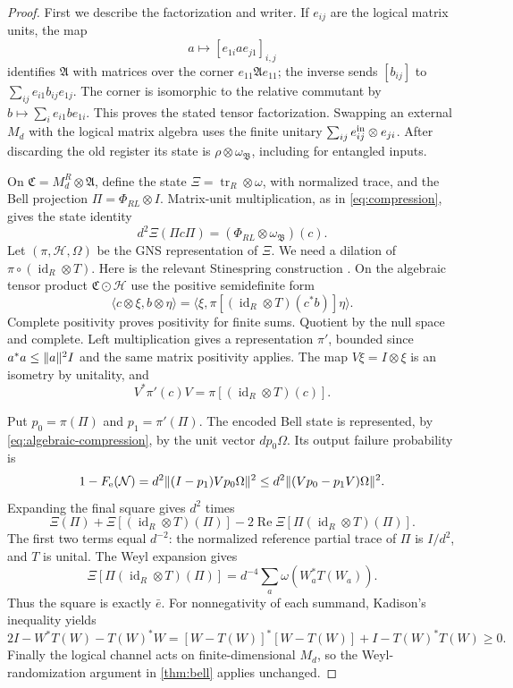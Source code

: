 \documentclass[11pt,reqno]{amsart}
\numberwithin{equation}{section}
\theoremstyle{definition}
\theoremstyle{remark}
\newcommand{\id}{\operatorname{id}}
\newcommand{\Rea}{\operatorname{Re}}
\newcommand{\Ncal}{\mathcal N}
\newcommand{\Fe}{F_{\mathrm e}}
\DeclarePairedDelimiter{\norm}{\lVert}{\rVert}
\begin{document}
\begin{proof}
First we describe the factorization and writer. If \(e_{ij}\) are the
logical matrix units, the map
\[
        a\longmapsto [e_{1i}ae_{j1}]_{i,j}
\]
identifies \(\mathfrak A\) with matrices over the corner
\(e_{11}\mathfrak A e_{11}\); the inverse sends \([b_{ij}]\) to
\(\sum_{ij}e_{i1}b_{ij}e_{1j}\).
The corner is isomorphic to the relative commutant by
\(b\mapsto\sum_i e_{i1}be_{1i}\).
This proves the stated tensor factorization.
Swapping an external \(M_d\) with the logical matrix algebra uses the
finite unitary \(\sum_{ij}e_{ij}^{\rm in}\otimes e_{ji}\).
After discarding the old register its state is
\(\rho\otimes\omega_{\mathfrak B}\), including for entangled inputs.

On \(\mathfrak C=M_d^R\otimes\mathfrak A\), define the state
\(\Xi=\operatorname{tr}_R\otimes\omega\), with normalized trace,
and the Bell projection \(\Pi=\Phi_{RL}\otimes I\).
Matrix-unit multiplication, as in \eqref{eq:compression}, gives the
state identity
\begin{equation}\label{eq:algebraic-compression}
       d^2\Xi(\Pi c\Pi)=(\Phi_{RL}\otimes\omega_{\mathfrak B})(c).
\end{equation}
Let \((\pi,\mathcal H,\Omega)\) be the GNS representation of \(\Xi\).
We need a dilation of \(\pi\circ(\id_R\otimes T)\).
Here is the relevant Stinespring construction \cite{Stinespring55}.
On the algebraic tensor product \(\mathfrak C\odot\mathcal H\) use the
positive semidefinite form
\[
 \langle c\otimes\xi,b\otimes\eta\rangle
  =\langle\xi,\pi[(\id_R\otimes T)(c^*b)]\eta\rangle.
\]
Complete positivity proves positivity for finite sums.
Quotient by the null space and complete. Left multiplication gives
a representation \(\pi'\), bounded since \(a^*a\le\norm a^2 I\)
and the same matrix positivity applies. The map \(V\xi=I\otimes\xi\)
is an isometry by unitality, and
\[
        V^*\pi'(c)V=\pi[(\id_R\otimes T)(c)].
\]

Put \(p_0=\pi(\Pi)\) and \(p_1=\pi'(\Pi)\).
The encoded Bell state is represented, by
\eqref{eq:algebraic-compression}, by the unit vector \(d p_0\Omega\).
Its output failure probability is
\[
 1-\Fe(\Ncal)
    =d^2\norm{(I-p_1)Vp_0\Omega}^2
    \le d^2\norm{(Vp_0-p_1V)\Omega}^2 .
\]
Expanding the final square gives \(d^2\) times
\[
 \Xi(\Pi)+\Xi[(\id_R\otimes T)(\Pi)]
       -2\Rea\Xi[\Pi(\id_R\otimes T)(\Pi)].
\]
The first two terms equal \(d^{-2}\): the normalized reference
partial trace of \(\Pi\) is \(I/d^2\), and \(T\) is unital.
The Weyl expansion gives
\[
 \Xi[\Pi(\id_R\otimes T)(\Pi)]
             =d^{-4}\sum_a\omega(W_a^*T(W_a)).
\]
Thus the square is exactly \(\bar e\).
For nonnegativity of each summand, Kadison's inequality yields
\[
 2I-W^*T(W)-T(W)^*W
 = [W-T(W)]^*[W-T(W)]+I-T(W)^*T(W)\ge0.
\]
Finally the logical channel acts on finite-dimensional \(M_d\), so the
Weyl-randomization argument in \cref{thm:bell} applies unchanged.
\end{proof}
\end{document}
